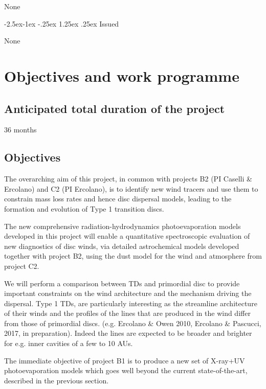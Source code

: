 \documentclass[10pt,fleqn,twoside]{article}
\makeatletter
\newcommand{\Tcol}{\color{blue}}
\renewcommand\paragraph{\@startsection{paragraph}{4}{\z@}%
            {-2.5ex\@plus -1ex \@minus -.25ex}%
            {1.25ex \@plus .25ex}%
            {\normalfont\normalsize\bfseries}}
\makeatother
\begin{document}
None

\paragraph{\Tcol Issued}

None

\section{\Tcol Objectives and work programme}
\renewcommand{\leftmark}{\sc Objectives and work programme}


\subsection{\Tcol Anticipated total duration of the project}

36 months

\subsection{\Tcol Objectives}


The overarching aim of this project, in common with projects B2 (PI
Caselli \& Ercolano) and C2 (PI Ercolano),
is to identify new wind tracers and use them to constrain mass loss rates and hence
disc dispersal models, leading to the formation and evolution of Type 1
transition discs. 

The new comprehensive radiation-hydrodynamics photoevaporation models
developed in this project will enable a quantitative
spectroscopic evaluation of new diagnostics of disc winds, via
detailed astrochemical models developed together with project B2,
using the dust model for the wind and atmosphere from project C2. 

We will perform a comparison between TDs and
primordial disc to provide important constraints on the wind
architecture and the mechanism driving the dispersal. 
Type 1 TDs, are particularly interesting as the streamline architecture of their winds
and the profiles of the lines that are produced in the wind
differ from those of primordial discs. (e.g. Ercolano \& Owen
2010, Ercolano \& Pascucci, 2017, in preparation). Indeed the lines
are expected to be broader and brighter for e.g. inner cavities of a few to 10 AUs.  

The immediate objective of project B1 is to produce a new set of
X-ray+UV photoevaporation models which goes well beyond the current
state-of-the-art, described in the previous section. 
\end{document}
